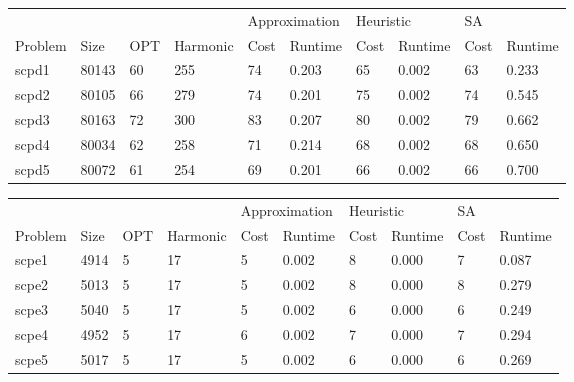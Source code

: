 \documentclass{report}
\begin{document}
\begin{table}[]
\centering
\begin{tabular}{@{}llllllllll@{}}
\toprule
        &       &     &          & \multicolumn{2}{l}{Approximation} & \multicolumn{2}{l}{Heuristic} & \multicolumn{2}{l}{SA} \\
Problem & Size  & OPT & Harmonic & Cost           & Runtime          & Cost         & Runtime        & Cost     & Runtime     \\ \midrule
scpd1   & 80143 & 60  & 255      & 74             & 0.203            & 65           & 0.002          & 63       & 0.233       \\
scpd2   & 80105 & 66  & 279      & 74             & 0.201            & 75           & 0.002          & 74       & 0.545       \\
scpd3   & 80163 & 72  & 300      & 83             & 0.207            & 80           & 0.002          & 79       & 0.662       \\
scpd4   & 80034 & 62  & 258      & 71             & 0.214            & 68           & 0.002          & 68       & 0.650       \\
scpd5   & 80072 & 61  & 254      & 69             & 0.201            & 66           & 0.002          & 66       & 0.700       \\ \bottomrule
\end{tabular}
\end{table}

\begin{table}[]
\centering
\begin{tabular}{@{}llllllllll@{}}
\toprule
        &      &     &          & \multicolumn{2}{l}{Approximation} & \multicolumn{2}{l}{Heuristic} & \multicolumn{2}{l}{SA} \\
Problem & Size & OPT & Harmonic & Cost           & Runtime          & Cost         & Runtime        & Cost     & Runtime     \\ \midrule
scpe1   & 4914 & 5   & 17       & 5              & 0.002            & 8            & 0.000          & 7        & 0.087       \\
scpe2   & 5013 & 5   & 17       & 5              & 0.002            & 8            & 0.000          & 8        & 0.279       \\
scpe3   & 5040 & 5   & 17       & 5              & 0.002            & 6            & 0.000          & 6        & 0.249       \\
scpe4   & 4952 & 5   & 17       & 6              & 0.002            & 7            & 0.000          & 7        & 0.294       \\
scpe5   & 5017 & 5   & 17       & 5              & 0.002            & 6            & 0.000          & 6        & 0.269       \\ \bottomrule
\end{tabular}
\end{table}
\end{document}
